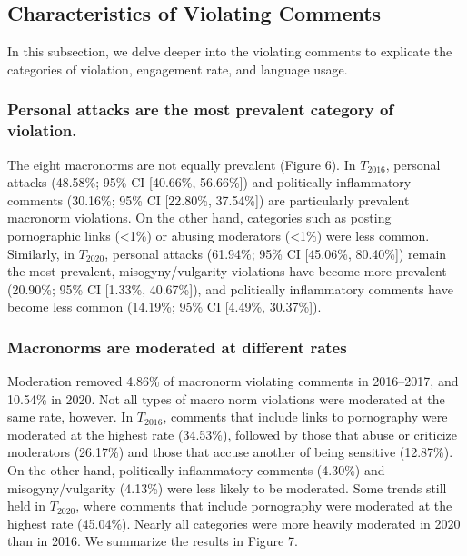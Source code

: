 


\subsection{Characteristics of Violating Comments}
In this subsection, we delve deeper into the violating comments to explicate the categories of violation, engagement rate, and language usage. 



\subsubsection{Personal attacks are the most prevalent category of violation.} 
The eight macronorms are not equally prevalent (Figure 6). In $T_{2016}$, personal attacks (48.58\%; 95\% CI [40.66\%, 56.66\%]) and politically inflammatory comments (30.16\%; 95\% CI [22.80\%, 37.54\%]) are particularly prevalent macronorm violations. On the other hand, categories such as posting pornographic links (<1\%) or abusing moderators (<1\%) were less common. Similarly, in $T_{2020}$, personal attacks (61.94\%; 95\% CI [45.06\%, 80.40\%]) remain the most prevalent, misogyny/vulgarity violations have become more prevalent (20.90\%; 95\% CI [1.33\%, 40.67\%]), and politically inflammatory comments have become less common (14.19\%; 95\% CI [4.49\%, 30.37\%]). 



\subsubsection{Macronorms are moderated at different rates} Moderation removed 4.86\% of macronorm violating comments in 2016–2017, and 10.54\% in 2020. Not all types of macro norm violations were moderated at the same rate, however.
In $T_{2016}$, comments that include links to pornography were moderated at the highest rate (34.53\%), followed by those that abuse or criticize moderators (26.17\%) and those that accuse another of being sensitive (12.87\%). On the other hand, politically inflammatory comments (4.30\%) and misogyny/vulgarity (4.13\%) were less likely to be moderated. Some trends still held in $T_{2020}$, where comments that include pornography were moderated at the highest rate (45.04\%). Nearly all categories were more heavily moderated in 2020 than in 2016.
We summarize the results in Figure 7. 



